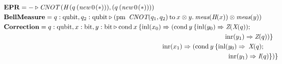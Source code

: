 \begin{align*}
  \hspace{-28pt}
      &\textbf{EPR} =  - \triangleright  \textit{CNOT} \hspace{2pt} (\textit{H}\hspace{2pt} (q  \hspace{2pt}    ( \textit{new}   \hspace{2pt}  0 \hspace{1pt}(*))),(q  \hspace{2pt}   ( \textit{new}   \hspace{2pt}  0 \hspace{1pt}(*))))  \\ 
      \hspace{-28pt}
      &\textbf{BellMeasure} =  q: \text{qubit}, q_{2}: \text{qubit}  \triangleright  (\text{pm}  \hspace{5pt} \textit{CNOT} (q_{1},q_{2})  \hspace{2pt}  \text{to} \hspace{2pt} x \otimes y.  \hspace{2pt}  \textit{meas} (\textit{H} (x)) \otimes \textit{meas} (y) ) \\
      \hspace{-28pt}
      &\textbf{Correction}= q: \text{qubit}, x: \text{bit},  y: \text{bit} \triangleright  \text{cond}\hspace{2pt} x  \hspace{2pt}  \{\text{inl} (x_{0}) \Rightarrow  (\text{cond}\hspace{2pt} y  \hspace{2pt}  \{\text{inl} (y_{0})  \Rightarrow  \textit{Z} (\textit{X}(q));  \\
      \hspace{-28pt}
      &\hspace{335pt} \text{inr} (y_{1}) \Rightarrow{} \textit{Z}(q))\}\\
      \hspace{-28pt}
      & \hspace{240pt}\text{inr} (x_{1})  \Rightarrow  (\text{cond}\hspace{2pt} y  \hspace{2pt}  \{\text{inl} (y_{0})  \Rightarrow  \hspace{2pt}   \textit{X} (q); \\
      \hspace{-28pt}
      & \hspace{335pt} \hspace{5pt} \text{inr} (y_{1}) \Rightarrow{}  \textit{I}(q)\})\}
 \end{align*}



